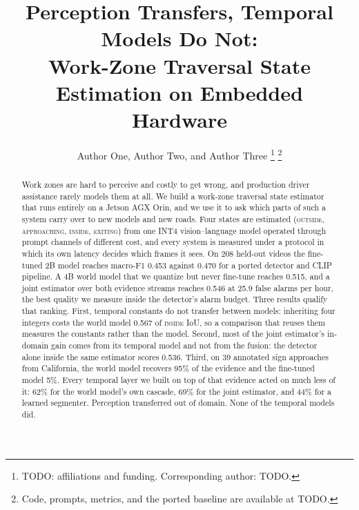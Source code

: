 \documentclass[journal]{IEEEtran}
\newcommand{\st}[1]{\textsc{#1}}
\begin{document}
\title{Perception Transfers, Temporal Models Do Not:\\
Work-Zone Traversal State Estimation on Embedded Hardware}

\author{Author One, Author Two, and Author Three \thanks{TODO: affiliations and funding.  Corresponding author: TODO.} \thanks{Code, prompts, metrics, and the ported baseline are available at TODO.}}

\maketitle

\begin{abstract}
Work zones are hard to perceive and costly to get wrong, and production driver assistance rarely models them at all.  We build a work-zone traversal state estimator that runs entirely on a Jetson AGX Orin, and we use it to ask which parts of such a system carry over to new models and new roads.  Four states are estimated (\st{outside}, \st{approaching}, \st{inside}, \st{exiting}) from one INT4 vision--language model operated through prompt channels of different cost, and every system is measured under a protocol in which its own latency decides which frames it sees.  On 208 held-out videos the fine-tuned 2B model reaches macro-F1 0.453 against 0.470 for a ported detector and CLIP pipeline.  A 4B world model that we quantize but never fine-tune reaches 0.515, and a joint estimator over both evidence streams reaches 0.546 at 25.9 false alarms per hour, the best quality we measure inside the detector's alarm budget.  Three results qualify that ranking.  First, temporal constants do not transfer between models: inheriting four integers costs the world model 0.567 of \st{inside} IoU, so a comparison that reuses them measures the constants rather than the model. Second, most of the joint estimator's in-domain gain comes from its temporal model and not from the fusion: the detector alone inside the same estimator scores 0.536.  Third, on 39 annotated sign approaches from California, the world model recovers 95\% of the evidence and the fine-tuned model 5\%.  Every temporal layer we built on top of that evidence acted on much less of it: 62\% for the world model's own cascade, 69\% for the joint estimator, and 44\% for a learned segmenter.  Perception transferred out of domain.  None of the temporal models did.
\end{abstract}
\end{document}
